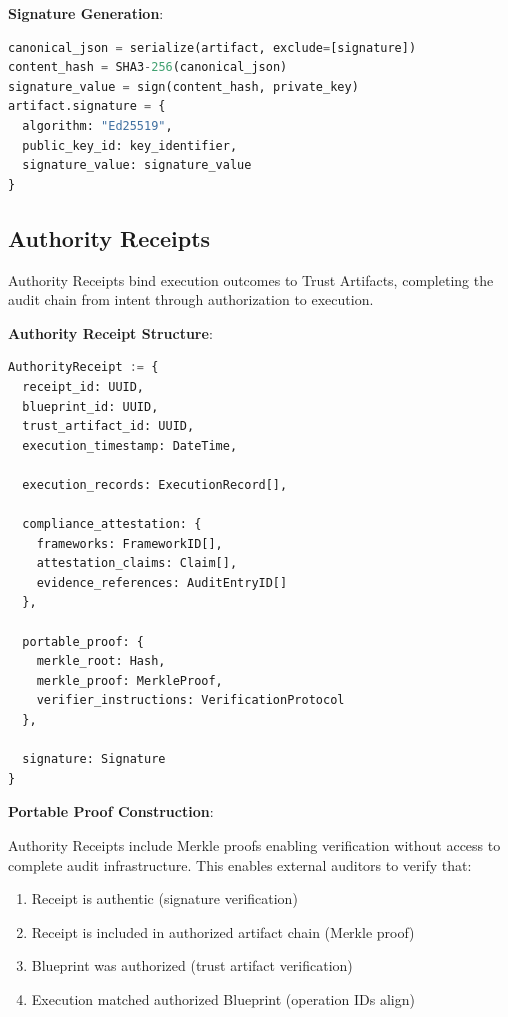 \documentclass[11pt,letterpaper]{article}
\begin{document}
\textbf{Signature Generation}:

\begin{lstlisting}[language=Python,caption=Signature Generation]
canonical_json = serialize(artifact, exclude=[signature])
content_hash = SHA3-256(canonical_json)
signature_value = sign(content_hash, private_key)
artifact.signature = {
  algorithm: "Ed25519",
  public_key_id: key_identifier,
  signature_value: signature_value
}
\end{lstlisting}

\subsection{Authority Receipts}

Authority Receipts bind execution outcomes to Trust Artifacts, completing the audit chain from intent through authorization to execution.

\textbf{Authority Receipt Structure}:

\begin{lstlisting}[language=Python,caption=Authority Receipt Structure]
AuthorityReceipt := {
  receipt_id: UUID,
  blueprint_id: UUID,
  trust_artifact_id: UUID,
  execution_timestamp: DateTime,
  
  execution_records: ExecutionRecord[],
  
  compliance_attestation: {
    frameworks: FrameworkID[],
    attestation_claims: Claim[],
    evidence_references: AuditEntryID[]
  },
  
  portable_proof: {
    merkle_root: Hash,
    merkle_proof: MerkleProof,
    verifier_instructions: VerificationProtocol
  },
  
  signature: Signature
}
\end{lstlisting}

\textbf{Portable Proof Construction}:

Authority Receipts include Merkle proofs enabling verification without access to complete audit infrastructure. This enables external auditors to verify that:
\begin{enumerate}
\item Receipt is authentic (signature verification)
\item Receipt is included in authorized artifact chain (Merkle proof)
\item Blueprint was authorized (trust artifact verification)
\item Execution matched authorized Blueprint (operation IDs align)
\end{enumerate}
\end{document}
